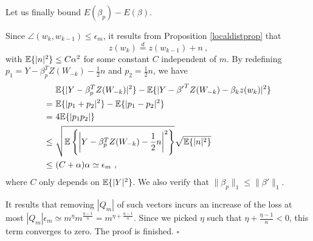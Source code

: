 Let us finally bound $E(\beta_p) - E(\beta)$. 

Since $\angle(w_k,w_{k-1}) \leq \epsilon_m $, 
it results from Proposition \ref{localdistprop} that 
$$z(w_k) \stackrel{d}{=}  z(w_{k-1}) + n~,$$
with ${\mathbb{E}}\{|n|^2\} \leq C\alpha^2$ for some constant $C$ independent of $m$. 
By redefining $p_1 = Y - \beta_p^T Z(W_{-k}) - \frac{1}{2} n$ and 
$p_2 = \frac{1}{2}n$, we have 
\begin{alignat*}{3}
&{\mathbb{E}} \{ | Y - \beta_p^T Z(W_{-k}) |^2 \} - {\mathbb{E}} \{ | Y - {\beta'}^T Z(W_{-k}) - \beta_k z(w_k) |^2 \} \\
=\ &{\mathbb{E}}\{ | p_1 + p_2 |^2 \} - {\mathbb{E}} \{ |p_1 - p_2 |^2 \} \\
=\ &4{\mathbb{E}} \{ |p_1 p_2| \} \\
\leq\ &\sqrt{ {\mathbb{E}}\left\{ \left|Y - \beta_p^T Z(W_{-k}) - \frac{1}{2} n \right|^2 \right\} } \sqrt{ {\mathbb{E}} \{ |n|^2 \} } \\
\leq\  &(C+\alpha) \alpha \simeq \epsilon_m~,
\end{alignat*}
where $C$ only depends on ${\mathbb{E}}\{|Y|^2\}$. We also verify that $\| \beta_p\|_1 \leq \| \beta'\|_1$.

It results that removing $|Q_m|$ of such vectors incurs an increase of the loss at most 
$|Q_m| \epsilon_m \simeq m^\eta m^{\frac{\eta-1}{n} } = m^{\eta + \frac{\eta-1}{n}}$. 
Since we picked $\eta$ such that $\eta + \frac{\eta-1}{n} <0$, this term converges to zero. The proof is finished. $\square$

%
%
%
%
%




